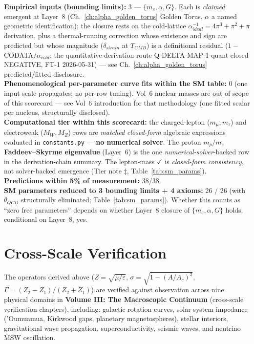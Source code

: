 \bigskip
\noindent
\textbf{Empirical inputs (bounding limits):} 3 --- $\{m_e, \alpha, G\}$. Each is \emph{claimed} emergent at Layer~8 (Ch.~\ref{ch:alpha_golden_torus} Golden Torus, $\alpha$ a named geometric identification); the closure rests on the cold-lattice $\alpha^{-1}_{ideal} = 4\pi^3+\pi^2+\pi$ derivation, plus a thermal-running correction whose existence and sign are predicted but whose magnitude ($\delta_{strain}$ at $T_{CMB}$) is a definitional residual ($1-$CODATA$/\alpha_{cold}$; the quantitative-derivation route Q-DELTA-MAP-1-quant closed NEGATIVE, FT-1 2026-05-31) --- see Ch.~\ref{ch:alpha_golden_torus} predicted/fitted disclosure.\\
\textbf{Phenomenological per-parameter curve fits within the SM table:} 0 (one input scale propagates; no per-row tuning). Vol~6 nuclear masses are out of scope of this scorecard --- see Vol~6 introduction for that methodology (one fitted scalar per nucleus, structurally disclosed).\\
\textbf{Computational tier within this scorecard:} the charged-lepton ($m_\mu, m_\tau$) and electroweak ($M_W, M_Z$) rows are \emph{matched closed-form} algebraic expressions evaluated in \texttt{constants.py} --- \textbf{no numerical solver}. The proton $m_p/m_e$ \textbf{Faddeev--Skyrme eigenvalue} (Layer~6) is the one \emph{numerical-solver}-backed row in the derivation-chain summary. The lepton-mass $\checkmark$ is \emph{closed-form consistency}, not solver-backed emergence (Tier note $\ddagger$, Table~\ref{tab:sm_params}).\\
\textbf{Predictions within 5\% of measurement:} 38/38.\\
\textbf{SM parameters reduced to 3 bounding limits + 4 axioms:} 26 / 26 (with $\theta_{QCD}$ structurally eliminated; Table~\ref{tab:sm_params}). Whether this counts as ``zero free parameters'' depends on whether Layer~8 closure of $\{m_e, \alpha, G\}$ holds; conditional on Layer~8, yes.

\section{Cross-Scale Verification}
\label{sec:cross_scale_identity}

The operators derived above ($Z = \sqrt{\mu/\varepsilon}$,
$\sigma = \sqrt{1 - (A/A_c)^2}$, $\Gamma = (Z_2 - Z_1)/(Z_2 + Z_1)$)
are verified against observation across nine physical domains in
\textbf{Volume III: The Macroscopic Continuum} (cross-scale verification chapters), including:
galactic rotation curves, solar system impedance ('Oumuamua,
Kirkwood gaps, planetary magnetospheres), stellar interiors,
gravitational wave propagation, superconductivity, seismic waves,
and neutrino MSW oscillation.

